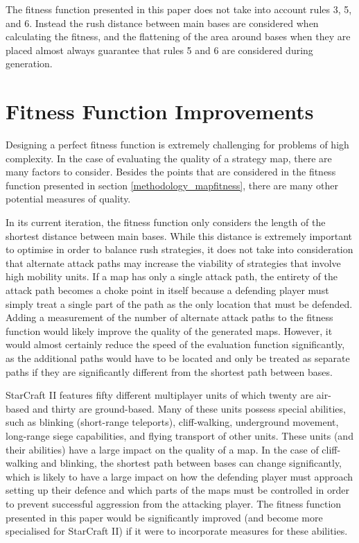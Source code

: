The fitness function presented in this paper does not take into account rules 3, 5, and 6. Instead the rush distance between main bases are considered when calculating the fitness, and the flattening of the area around bases when they are placed almost always guarantee that rules 5 and 6 are considered during generation.

\section{Fitness Function Improvements}
\label{futurework_fitness}
Designing a perfect fitness function is extremely challenging for problems of high complexity. In the case of evaluating the quality of a strategy map, there are many factors to consider. Besides the points that are considered in the fitness function presented in section \ref{methodology_mapfitness}, there are many other potential measures of quality. 

In its current iteration, the fitness function only considers the length of the shortest distance between main bases. While this distance is extremely important to optimise in order to balance rush strategies, it does not take into consideration that alternate attack paths may increase the viability of strategies that involve high mobility units. If a map has only a single attack path, the entirety of the attack path becomes a choke point in itself because a defending player must simply treat a single part of the path as the only location that must be defended. Adding a measurement of the number of alternate attack paths to the fitness function would likely improve the quality of the generated maps. However, it would almost certainly reduce the speed of the evaluation function significantly, as the additional paths would have to be located and only be treated as separate paths if they are significantly different from the shortest path between bases.

StarCraft II features fifty different multiplayer units of which twenty are air-based and thirty are ground-based. Many of these units possess special abilities, such as blinking (short-range teleports), cliff-walking, underground movement, long-range siege capabilities, and flying transport of other units. These units (and their abilities) have a large impact on the quality of a map. In the case of cliff-walking and blinking, the shortest path between bases can change significantly, which is likely to have a large impact on how the defending player must approach setting up their defence and which parts of the maps must be controlled in order to prevent successful aggression from the attacking player. The fitness function presented in this paper would be significantly improved (and become more specialised for StarCraft II) if it were to incorporate measures for these abilities.

